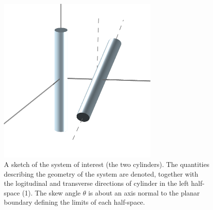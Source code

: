 \documentclass[onecolumn,letterpaper,amsmath,amssymb,floatfix,aps,superscriptaddress]{revtex4}
\begin{document}
\begin{figure}
\centerline{\includegraphics[width=8cm]{./140220_cyl-cyl/sketch.pdf}}
\caption{A sketch of the system of interest (the two cylinders). The quantities describing the geometry of the system are 
denoted, together with the logitudinal and transverse directions of cylinder in the left half-space (1). The skew angle $\theta$ is about an axis normal to the planar boundary defining the limits of each half-space.
}
\label{fig:sketch}
\end{figure}
\end{document}

